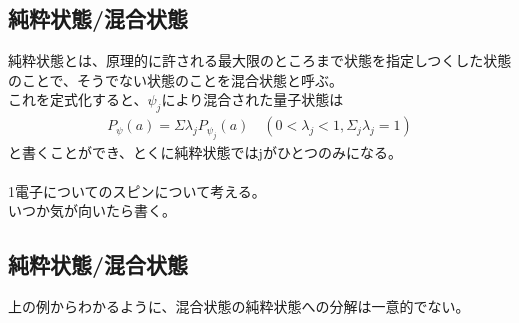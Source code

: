 \documentclass[a4paper,11pt]{jsarticle}
\begin{document}
\subsection{純粋状態/混合状態}
純粋状態とは、原理的に許される最大限のところまで状態を指定しつくした状態のことで、そうでない状態のことを混合状態と呼ぶ。\\
これを定式化すると、$\psi _j$により混合された量子状態は
\begin{align}
P_{\psi}(a)=\Sigma \lambda _j P_{\psi _j}(a)\quad (0<\lambda _j <1,\Sigma_j \lambda _j=1)
\end{align}
と書くことができ、とくに純粋状態ではjがひとつのみになる。\\
\\
1電子についてのスピンについて考える。\\
いつか気が向いたら書く。
\subsection{純粋状態/混合状態}
上の例からわかるように、混合状態の純粋状態への分解は一意的でない。
\\
\end{document}
